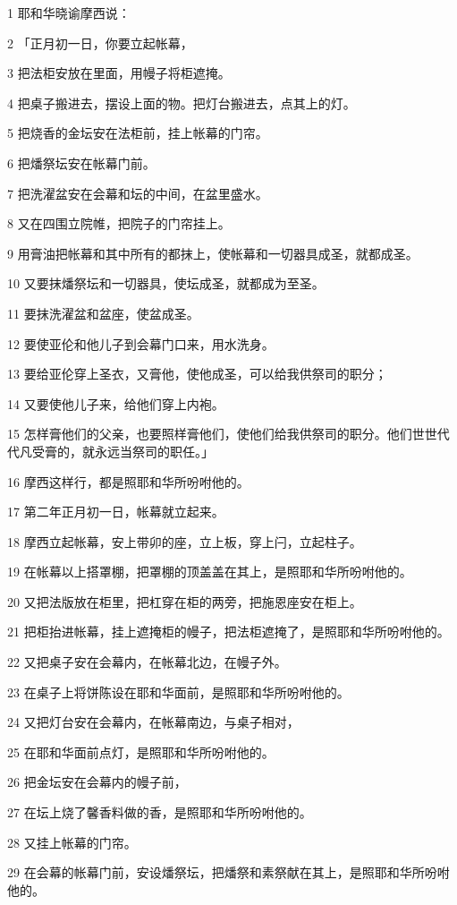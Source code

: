 \par 1 耶和华晓谕摩西说：
\par 2 「正月初一日，你要立起帐幕，
\par 3 把法柜安放在里面，用幔子将柜遮掩。
\par 4 把桌子搬进去，摆设上面的物。把灯台搬进去，点其上的灯。
\par 5 把烧香的金坛安在法柜前，挂上帐幕的门帘。
\par 6 把燔祭坛安在帐幕门前。
\par 7 把洗濯盆安在会幕和坛的中间，在盆里盛水。
\par 8 又在四围立院帷，把院子的门帘挂上。
\par 9 用膏油把帐幕和其中所有的都抹上，使帐幕和一切器具成圣，就都成圣。
\par 10 又要抹燔祭坛和一切器具，使坛成圣，就都成为至圣。
\par 11 要抹洗濯盆和盆座，使盆成圣。
\par 12 要使亚伦和他儿子到会幕门口来，用水洗身。
\par 13 要给亚伦穿上圣衣，又膏他，使他成圣，可以给我供祭司的职分；
\par 14 又要使他儿子来，给他们穿上内袍。
\par 15 怎样膏他们的父亲，也要照样膏他们，使他们给我供祭司的职分。他们世世代代凡受膏的，就永远当祭司的职任。」
\par 16 摩西这样行，都是照耶和华所吩咐他的。
\par 17 第二年正月初一日，帐幕就立起来。
\par 18 摩西立起帐幕，安上带卯的座，立上板，穿上闩，立起柱子。
\par 19 在帐幕以上搭罩棚，把罩棚的顶盖盖在其上，是照耶和华所吩咐他的。
\par 20 又把法版放在柜里，把杠穿在柜的两旁，把施恩座安在柜上。
\par 21 把柜抬进帐幕，挂上遮掩柜的幔子，把法柜遮掩了，是照耶和华所吩咐他的。
\par 22 又把桌子安在会幕内，在帐幕北边，在幔子外。
\par 23 在桌子上将饼陈设在耶和华面前，是照耶和华所吩咐他的。
\par 24 又把灯台安在会幕内，在帐幕南边，与桌子相对，
\par 25 在耶和华面前点灯，是照耶和华所吩咐他的。
\par 26 把金坛安在会幕内的幔子前，
\par 27 在坛上烧了馨香料做的香，是照耶和华所吩咐他的。
\par 28 又挂上帐幕的门帘。
\par 29 在会幕的帐幕门前，安设燔祭坛，把燔祭和素祭献在其上，是照耶和华所吩咐他的。
